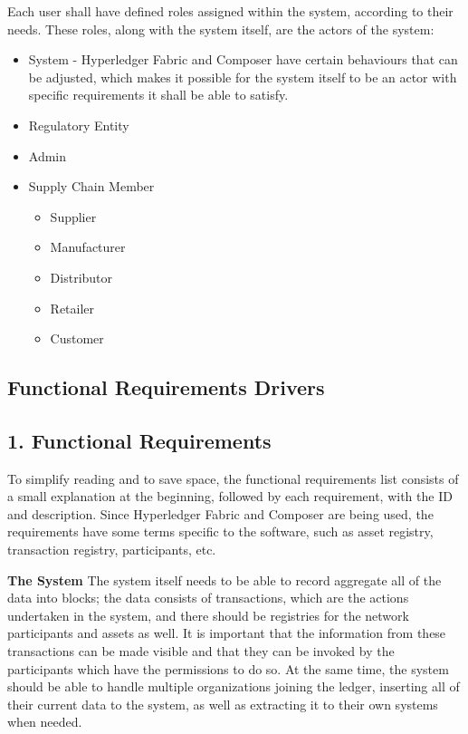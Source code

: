 	Each user shall have defined roles assigned within the system, according to their needs. These roles, along with the system itself, are the actors of the system:
		\begin{itemize}
			\item System - Hyperledger Fabric and Composer have certain behaviours that can be adjusted, which makes it possible for the system itself to be an actor with specific requirements it shall be able to satisfy.
			\item Regulatory Entity
			\item Admin
			\item Supply Chain Member
			\begin{itemize}
				\item Supplier  %
				\item  Manufacturer
				\item Distributor
				\item Retailer
				\item Customer
		\end{itemize}
	\end{itemize}
\subsection{Functional Requirements Drivers}
	
\subsection*{1. Functional  Requirements}

To simplify reading and to save space, the functional requirements list consists of a small explanation at the beginning, followed by each requirement, with the ID and description. Since Hyperledger Fabric and Composer are being used, the requirements have some terms specific to the software, such as asset registry, transaction registry, participants, etc.

		\par \textbf{The System}
		 The system itself needs to be able to record aggregate all of the data into blocks; the data consists of transactions, which are the actions undertaken in the system, and there should be registries for the network participants and assets as well. It is important that the information from these transactions can be made visible and that they can be invoked by the participants which have the permissions to do so. At the same time, the system should be able to handle multiple organizations joining the ledger, inserting all of their current data to the system, as well as extracting it to their own systems when needed. 
		
